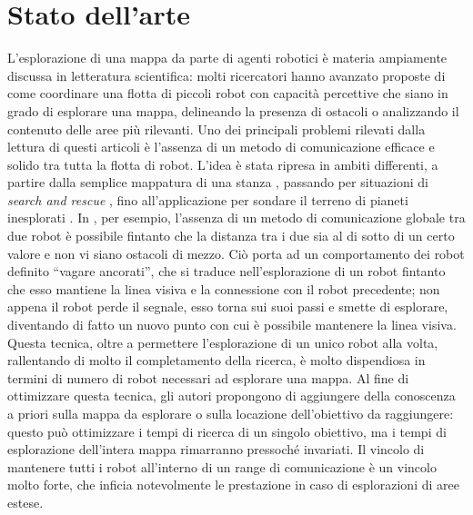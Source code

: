 \chapter{Stato dell'arte}
\label{chap:stateofart}
L'esplorazione di una mappa da parte di agenti robotici è materia ampiamente discussa in letteratura scientifica: molti ricercatori hanno avanzato proposte di come coordinare una flotta di piccoli robot con capacità percettive che siano in grado di esplorare una mappa, delineando la presenza di ostacoli o analizzando il contenuto delle aree più rilevanti. Uno dei principali problemi rilevati dalla lettura di questi articoli è l'assenza di un metodo di comunicazione efficace e solido tra tutta la flotta di robot. 
L'idea è stata ripresa in ambiti differenti, a partire dalla semplice mappatura di una stanza \cite{de2009role}, passando per situazioni di \textit{search and rescue} \cite{kitano1999robocup}, fino all'applicazione per sondare il terreno di pianeti inesplorati \cite{moorehead2001multiple}.
In \cite{arkin2002line}, per esempio, l'assenza di un metodo di comunicazione globale tra due robot è possibile fintanto che la distanza tra i due sia al di sotto di un certo valore e non vi siano ostacoli di mezzo. Ciò porta ad un comportamento dei robot definito “vagare ancorati”, che si traduce nell'esplorazione di un robot fintanto che esso mantiene la linea visiva e la connessione con il robot precedente; non appena il robot perde il segnale, esso torna sui suoi passi e smette di esplorare, diventando di fatto un nuovo punto con cui è possibile mantenere la linea visiva. Questa tecnica, oltre a permettere l'esplorazione di un unico robot alla volta, rallentando di molto il completamento della ricerca, è molto dispendiosa in termini di numero di robot necessari ad esplorare una mappa. Al fine di ottimizzare questa tecnica, gli autori propongono di aggiungere della conoscenza a priori sulla mappa da esplorare o sulla locazione dell'obiettivo da raggiungere: questo può ottimizzare i tempi di ricerca di un singolo obiettivo, ma i tempi di esplorazione dell'intera mappa rimarranno pressoché invariati. Il vincolo di mantenere tutti i robot all'interno di un range di comunicazione è un vincolo molto forte, che inficia notevolmente le prestazione in caso di esplorazioni di aree estese.\\
